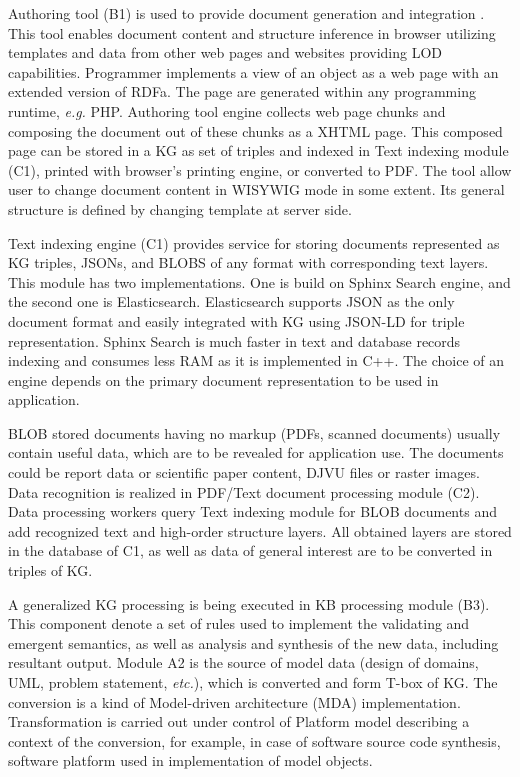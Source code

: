 \documentclass[
]{ceurart}
\begin{document}
Authoring tool (B1) is used to provide document generation and integration \cite{sibiricon}.  This tool enables document content and structure inference in browser utilizing templates and data from other web pages and websites providing LOD capabilities.  Programmer implements a view of an object as a web page with an extended version of RDFa.  The page are generated within any programming runtime, \emph{e.g.} PHP.  Authoring tool engine collects web page chunks and composing the document out of these chunks as a XHTML page.  This composed page can be stored in a KG as set of triples and indexed in Text indexing module (C1), printed with browser's printing engine, or converted to PDF.  The tool allow user to change document content in WISYWIG mode in some extent.  Its general structure is defined by changing template at server side.

Text indexing engine (C1) provides service for storing documents represented as KG triples, JSONs, and BLOBS of any format with corresponding text layers.  This module has two implementations.  One is build on Sphinx Search engine, and the second one is Elasticsearch.  Elasticsearch supports JSON as the only document format and easily integrated with KG using JSON-LD for triple representation.  Sphinx Search is much faster in text and database records indexing and consumes less RAM as it is implemented in C++.  The choice of an engine depends on the primary document representation to be used in application.

BLOB stored documents having no markup (PDFs, scanned documents) usually contain useful data, which are to be revealed for application use.  The documents could be report data or scientific paper content, DJVU files or raster images.  Data recognition is realized in PDF/Text document processing module (C2).  Data processing workers query Text indexing module for BLOB documents and add recognized text and high-order structure layers.  All obtained layers are stored in the database of C1, as well as data of general interest are to be converted in triples of KG.

A generalized KG processing is being executed in KB processing module (B3).  This component denote a set of rules used to implement the validating and emergent semantics, as well as analysis and synthesis of the new data, including resultant output.  Module A2 is the source of model data (design of domains, UML, problem statement, \emph{etc.}), which is converted and form T-box of KG.  The conversion is a kind of Model-driven architecture (MDA) implementation.  Transformation is carried out under control of Platform model describing a context of the conversion, for example, in case of software source code synthesis, software platform used in implementation of model objects.
\end{document}

